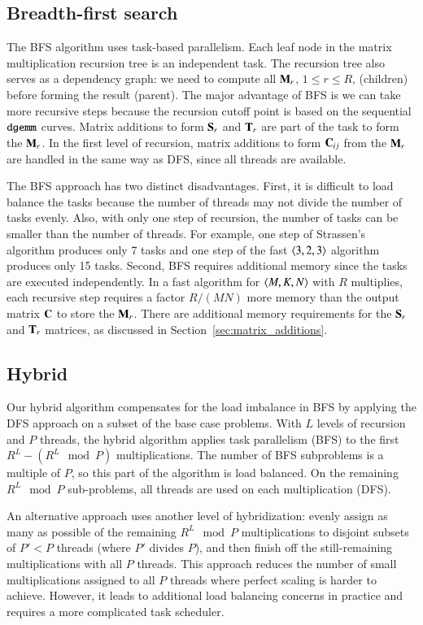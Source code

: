 \documentclass[preprint]{sigplanconf}
\newcommand{\M}[2][]{{\bm{#1\mathbf{\MakeUppercase{#2}}}}}
\begin{document}
\subsection{Breadth-first search}
\label{sec:par_bfs}

The BFS algorithm uses task-based parallelism.
Each leaf node in the matrix multiplication recursion tree is an independent task.
The recursion tree also serves as a dependency graph: we need to compute all $\M{M}_r$, $1 \le r \le R$, (children) before forming the result (parent).
The major advantage of BFS is we can take more recursive steps because the recursion cutoff point is based on the sequential $\texttt{dgemm}$ curves.
Matrix additions to form $\M{S}_r$ and $\M{T}_r$ are part of the task to form the $\M{M}_r$.
In the first level of recursion, matrix additions to form $\M{C}_{ij}$ from the $\M{M}_r$ 
are handled in the same way as DFS, since all threads are available.

The BFS approach has two distinct disadvantages.
First, it is difficult to load balance the tasks because the number of threads may not divide the number of tasks evenly.
Also, with only one step of recursion, the number of tasks can be smaller than the number of threads.
For example, one step of Strassen's algorithm produces only 7 tasks and one step of the fast $\left\langle3, 2, 3\right\rangle$ algorithm produces only 15 tasks.
Second, BFS requires additional memory since the tasks are executed independently.
In a fast algorithm for $\left\langle M, K, N\right\rangle$ with $R$ multiplies, each recursive step requires a factor $R / (MN)$ more memory than the output matrix $\M{C}$ to store the $\M{M}_r$.
There are additional memory requirements for the $\M{S}_r$ and $\M{T}_r$ matrices, as discussed in Section~\ref{sec:matrix_additions}.

\subsection{Hybrid}
\label{sec:par_hybrid}

Our hybrid algorithm compensates for the load imbalance in BFS by applying the DFS approach on a subset of the base case problems.
With $L$ levels of recursion and $P$ threads, the hybrid algorithm applies task parallelism (BFS) to the first $R^L - (R^L \mod P)$ multiplications.
The number of BFS subproblems is a multiple of $P$, so this part of the algorithm is load balanced.
On the remaining $R^L \mod P$ sub-problems, all threads are used on each multiplication (DFS).

An alternative approach uses another level of hybridization: evenly assign as many as possible of the remaining $R^L \mod P$ multiplications to disjoint subsets of $P'<P$ threads (where $P'$ divides $P$), and then finish off the still-remaining multiplications with all $P$ threads.
This approach reduces the number of small multiplications assigned to all $P$ threads where perfect scaling is harder to achieve.
However, it leads to additional load balancing concerns in practice and requires a more complicated task scheduler.
\end{document}
